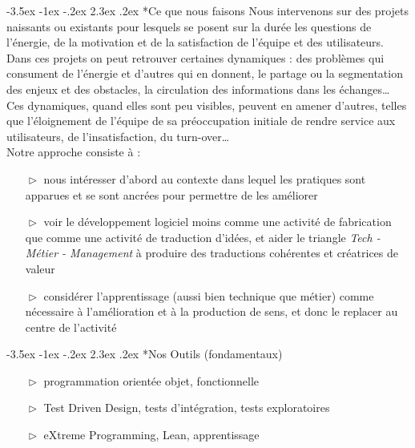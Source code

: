 \documentclass[12pt,svgnames]{article}
\makeatletter
\renewcommand{\sfdefault}{phv}
\renewcommand\section{\@startsection {section}{1}{\z@}%
                                   {-3.5ex \@plus -1ex \@minus -.2ex}%
                                   {2.3ex \@plus.2ex}%
                                   {\fontfamily{\sfdefault}\selectfont\normalfont\Large\sffamily}}
\makeatother
\begin{document}
\thispagestyle{empty}
{\fontfamily{\sfdefault}\selectfont
    \section*{Ce que nous faisons}
    Nous intervenons sur des projets naissants ou existants pour lesquels se posent sur la durée les questions de l'énergie, de la motivation et de la satisfaction de l'équipe et des utilisateurs.\\

    Dans ces projets on peut retrouver certaines dynamiques : des problèmes qui consument de l'énergie et d'autres qui en donnent, le partage ou la segmentation des enjeux et des obstacles, la circulation des informations dans les échanges\ldots{} Ces dynamiques, quand elles sont peu visibles, peuvent en amener d'autres, telles que l'éloignement de l'équipe de sa préoccupation initiale de rendre service aux utilisateurs, de l'insatisfaction, du turn-over\ldots{}\\

    Notre approche consiste à :
    \begin{itemize}
        \item[$\vartriangleright$] nous intéresser d'abord au contexte dans lequel les pratiques sont apparues et se sont ancrées pour permettre de les améliorer 
        \item[$\vartriangleright$] voir le développement logiciel moins comme une activité de fabrication que comme une activité de traduction d'idées, et aider le triangle \emph{Tech - Métier - Management} à produire des traductions cohérentes et créatrices de valeur
        \item[$\vartriangleright$] considérer l'apprentissage (aussi bien technique que métier) comme nécessaire à l'amélioration et à la production de sens, et donc le replacer au centre de l'activité
    \end{itemize}
    \section*{Nos Outils (fondamentaux)}
    \begin{itemize}
        \item[$\vartriangleright$]
            programmation orientée objet, fonctionnelle
        \item[$\vartriangleright$]
            Test Driven Design, tests d'intégration, tests exploratoires
        \item[$\vartriangleright$]
            eXtreme Programming, Lean, apprentissage
    \end{itemize}
}
\end{document}
